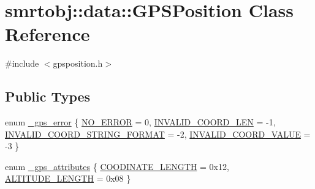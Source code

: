 \hypertarget{classsmrtobj_1_1data_1_1_g_p_s_position}{}\section{smrtobj\+:\+:data\+:\+:G\+P\+S\+Position Class Reference}
\label{classsmrtobj_1_1data_1_1_g_p_s_position}


{\ttfamily \#include $<$gpsposition.\+h$>$}

\subsection*{Public Types}
\begin{DoxyCompactItemize}
\item 
enum \hyperlink{classsmrtobj_1_1data_1_1_g_p_s_position_a0f195dc65dbcc37ac78c049a3b9d4e13}{\+\_\+gps\+\_\+error} \{ \hyperlink{classsmrtobj_1_1data_1_1_g_p_s_position_a0f195dc65dbcc37ac78c049a3b9d4e13afd820a612559d268f9f78c366114875a}{N\+O\+\_\+\+E\+R\+R\+O\+R} = 0, 
\hyperlink{classsmrtobj_1_1data_1_1_g_p_s_position_a0f195dc65dbcc37ac78c049a3b9d4e13a210a97200e6d1e0a4271fe4eaebeb54a}{I\+N\+V\+A\+L\+I\+D\+\_\+\+C\+O\+O\+R\+D\+\_\+\+L\+E\+N} = -\/1, 
\hyperlink{classsmrtobj_1_1data_1_1_g_p_s_position_a0f195dc65dbcc37ac78c049a3b9d4e13a9303e3a3bbe0f9635de6e5c6b85ba1ee}{I\+N\+V\+A\+L\+I\+D\+\_\+\+C\+O\+O\+R\+D\+\_\+\+S\+T\+R\+I\+N\+G\+\_\+\+F\+O\+R\+M\+A\+T} = -\/2, 
\hyperlink{classsmrtobj_1_1data_1_1_g_p_s_position_a0f195dc65dbcc37ac78c049a3b9d4e13ac26008cab8d561e0ad3a5e9b3f0d9984}{I\+N\+V\+A\+L\+I\+D\+\_\+\+C\+O\+O\+R\+D\+\_\+\+V\+A\+L\+U\+E} = -\/3
 \}
\item 
enum \hyperlink{classsmrtobj_1_1data_1_1_g_p_s_position_ae0de326a922ce1ae51e6235880667142}{\+\_\+gps\+\_\+attributes} \{ \hyperlink{classsmrtobj_1_1data_1_1_g_p_s_position_ae0de326a922ce1ae51e6235880667142a55274b902526850b89e6c2e2175aa42b}{C\+O\+O\+D\+I\+N\+A\+T\+E\+\_\+\+L\+E\+N\+G\+T\+H} = 0x12, 
\hyperlink{classsmrtobj_1_1data_1_1_g_p_s_position_ae0de326a922ce1ae51e6235880667142a63c73b2cc4dcd24abdf14c30e164593e}{A\+L\+T\+I\+T\+U\+D\+E\+\_\+\+L\+E\+N\+G\+T\+H} = 0x08
 \}
\end{DoxyCompactItemize}
